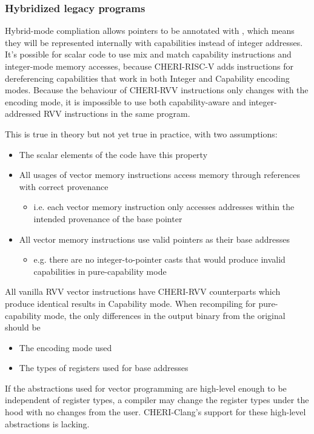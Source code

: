 \subsubsection*{Hybridized legacy programs}
Hybrid-mode compliation allows pointers to be annotated with , which means they will be represented internally with capabilities instead of integer addresses.
It's possible for scalar code to use mix and match capability instructions and integer-mode memory accesses, because CHERI-RISC-V adds instructions for dereferencing capabilities that work in both Integer and Capability encoding modes.
Because the behaviour of CHERI-RVV instructions only changes with the encoding mode, it is impossible to use both capability-aware and integer-addressed RVV instructions in the same program.

This is true in theory but not yet true in practice, with two assumptions:
\begin{itemize}
    \item The scalar elements of the code have this property
    \item All usages of vector memory instructions access memory through references with correct provenance
    \begin{itemize}
        \item i.e. each vector memory instruction only accesses addresses within the intended provenance of the base pointer
    \end{itemize}
    \item All vector memory instructions use valid pointers as their base addresses
    \begin{itemize}
        \item e.g. there are no integer-to-pointer casts that would produce invalid capabilities in pure-capability mode
    \end{itemize}
\end{itemize}

All vanilla RVV vector instructions have CHERI-RVV counterparts which produce identical results in Capability mode.
When recompiling for pure-capability mode, the only differences in the output binary from the original should be
\begin{itemize}
    \item The encoding mode used
    \item The types of registers used for base addresses
\end{itemize}
If the abstractions used for vector programming are high-level enough to be independent of register types, a compiler may change the register types under the hood with no changes from the user.
CHERI-Clang's support for these high-level abstractions is lacking.

